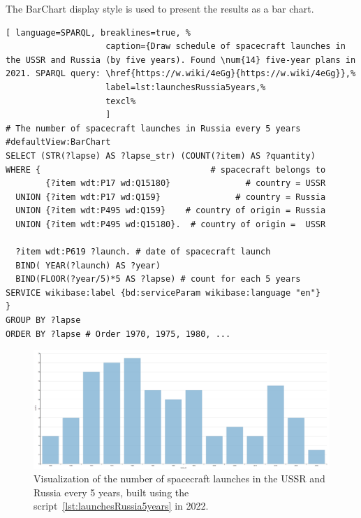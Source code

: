 The BarChart display style is used to present the results as a bar chart.

\begin{lstlisting}[ language=SPARQL, breaklines=true, %
                    caption={Draw schedule of spacecraft launches in the USSR and Russia (by five years). Found \num{14} five-year plans in 2021. SPARQL query: \href{https://w.wiki/4eGg}{https://w.wiki/4eGg}},%
                    label=lst:launchesRussia5years,%
                    texcl%
                    ]
# The number of spacecraft launches in Russia every 5 years
#defaultView:BarChart
SELECT (STR(?lapse) AS ?lapse_str) (COUNT(?item) AS ?quantity)
WHERE {                                  # spacecraft belongs to
        {?item wdt:P17 wd:Q15180}               # country = USSR
  UNION {?item wdt:P17 wd:Q159}               # country = Russia
  UNION {?item wdt:P495 wd:Q159}    # country of origin = Russia
  UNION {?item wdt:P495 wd:Q15180}.  # country of origin =  USSR
  
  ?item wdt:P619 ?launch. # date of spacecraft launch
  BIND( YEAR(?launch) AS ?year) 
  BIND(FLOOR(?year/5)*5 AS ?lapse) # count for each 5 years
SERVICE wikibase:label {bd:serviceParam wikibase:language "en"}
} 
GROUP BY ?lapse
ORDER BY ?lapse # Order 1970, 1975, 1980, ...
\end{lstlisting}%

\begin{figure}[h!]
  \includegraphics[width=\linewidth]{graphics/chapter/spacecraft/Visualization of the number of spacecraft launches in USSR and Russia per 5 years 2022.png}
  \caption[Schedule of spacecraft launches in the USSR and Russia (by five years)] {Visualization of the number of spacecraft launches in the USSR and Russia every 5 years, built using the script~\protect\ref{lst:launchesRussia5years} in 2022.}%
  \label{fig:launchesRussia5years}%
\end{figure}
